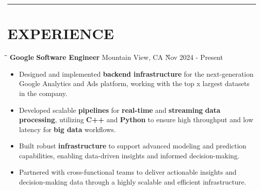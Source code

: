 \documentclass{res}
\begin{document}
\begin{resume}
\vspace{-8pt}
\hspace{-0.55in}
\noindent\rule[0.25\baselineskip]{19.36cm}{0.5pt}    

\vspace{-0.2in}
\section{EXPERIENCE}
    \vspace{0.00in}	
    \begin{tabbing}
    \hspace{1.5in}\= \hspace{2in}\= \hspace{1.6in}\= \kill %
    {\bf Google} \> {\bf Software Engineer}  \>  
                                    Mountain View, CA    \` Nov 2024 - Present\\
    \end{tabbing}\vspace{-20pt}      %
    \vspace{+0.1in}
    \begin{itemize} \itemsep 1.5pt %
    \item Designed and implemented {\bf backend infrastructure} for the next-generation Google Analytics and Ads 
        platform, working with the top x largest datasets in the company.
    \item Developed scalable {\bf pipelines} for {\bf real-time} and {\bf streaming} {\bf data processing}, 
        utilizing {\bf C++} and {\bf Python} to ensure high throughput and low latency for {\bf big data} workflows.
    \item Built robust {\bf infrastructure} to support advanced modeling and prediction capabilities, 
        enabling data-driven insights and informed decision-making.
    \item Partnered with cross-functional teams to deliver actionable insights and decision-making data through 
        a highly scalable and efficient infrastructure.
    \end{itemize}



\end{resume}
\end{document}
